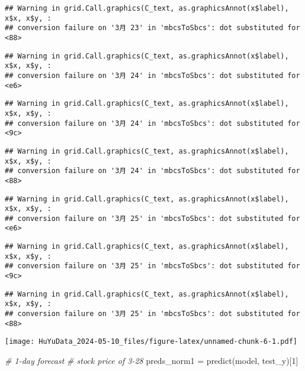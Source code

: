 \documentclass[
]{article}
\newenvironment{Shaded}{\begin{snugshade}}{\end{snugshade}}
\newcommand{\CommentTok}[1]{\textcolor[rgb]{0.56,0.35,0.01}{\textit{#1}}}
\newcommand{\DecValTok}[1]{\textcolor[rgb]{0.00,0.00,0.81}{#1}}
\newcommand{\FunctionTok}[1]{\textcolor[rgb]{0.00,0.00,0.00}{#1}}
\newcommand{\NormalTok}[1]{#1}
\newcommand{\OtherTok}[1]{\textcolor[rgb]{0.56,0.35,0.01}{#1}}
\begin{document}
\begin{verbatim}
## Warning in grid.Call.graphics(C_text, as.graphicsAnnot(x$label), x$x, x$y, :
## conversion failure on '3月 23' in 'mbcsToSbcs': dot substituted for <88>
\end{verbatim}

\begin{verbatim}
## Warning in grid.Call.graphics(C_text, as.graphicsAnnot(x$label), x$x, x$y, :
## conversion failure on '3月 24' in 'mbcsToSbcs': dot substituted for <e6>
\end{verbatim}

\begin{verbatim}
## Warning in grid.Call.graphics(C_text, as.graphicsAnnot(x$label), x$x, x$y, :
## conversion failure on '3月 24' in 'mbcsToSbcs': dot substituted for <9c>
\end{verbatim}

\begin{verbatim}
## Warning in grid.Call.graphics(C_text, as.graphicsAnnot(x$label), x$x, x$y, :
## conversion failure on '3月 24' in 'mbcsToSbcs': dot substituted for <88>
\end{verbatim}

\begin{verbatim}
## Warning in grid.Call.graphics(C_text, as.graphicsAnnot(x$label), x$x, x$y, :
## conversion failure on '3月 25' in 'mbcsToSbcs': dot substituted for <e6>
\end{verbatim}

\begin{verbatim}
## Warning in grid.Call.graphics(C_text, as.graphicsAnnot(x$label), x$x, x$y, :
## conversion failure on '3月 25' in 'mbcsToSbcs': dot substituted for <9c>
\end{verbatim}

\begin{verbatim}
## Warning in grid.Call.graphics(C_text, as.graphicsAnnot(x$label), x$x, x$y, :
## conversion failure on '3月 25' in 'mbcsToSbcs': dot substituted for <88>
\end{verbatim}

\texttt{[image: HuYuData\_2024-05-10\_files/figure-latex/unnamed-chunk-6-1.pdf]}

\begin{Shaded}
\begin{Highlighting}[]
\CommentTok{\# 1{-}day forecast}
\CommentTok{\# stock price of 3{-}28}
\NormalTok{preds\_norm1 }\OtherTok{=} \FunctionTok{predict}\NormalTok{(model, test\_y)[}\DecValTok{1}\NormalTok{]}
\end{Highlighting}
\end{Shaded}
\end{document}
